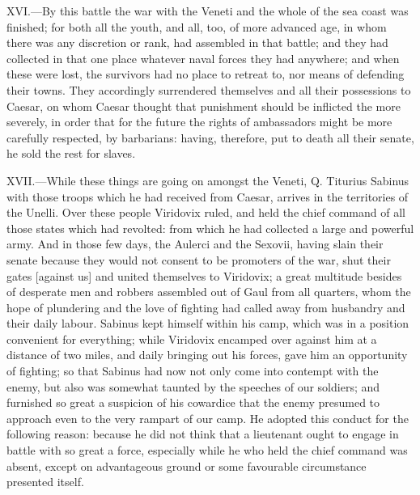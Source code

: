 XVI.—By this battle the war with the Veneti and the whole of the sea
coast was finished; for both all the youth, and all, too, of more
advanced age, in whom there was any discretion or rank, had assembled in
that battle; and they had collected in that one place whatever naval
forces they had anywhere; and when these were lost, the survivors had no
place to retreat to, nor means of defending their towns. They
accordingly surrendered themselves and all their possessions to Caesar,
on whom Caesar thought that punishment should be inflicted the more
severely, in order that for the future the rights of ambassadors might
be more carefully respected, by barbarians: having, therefore, put to
death all their senate, he sold the rest for slaves.

XVII.—While these things are going on amongst the Veneti, Q. Titurius
Sabinus with those troops which he had received from Caesar, arrives in
the territories of the Unelli. Over these people Viridovix ruled, and
held the chief command of all those states which had revolted: from
which he had collected a large and powerful army. And in those few days,
the Aulerci and the Sexovii, having slain their senate because they
would not consent to be promoters of the war, shut their gates [against
us] and united themselves to Viridovix; a great multitude besides of
desperate men and robbers assembled out of Gaul from all quarters, whom
the hope of plundering and the love of fighting had called away from
husbandry and their daily labour. Sabinus kept himself within his camp,
which was in a position convenient for everything; while Viridovix
encamped over against him at a distance of two miles, and daily bringing
out his forces, gave him an opportunity of fighting; so that Sabinus had
now not only come into contempt with the enemy, but also was somewhat
taunted by the speeches of our soldiers; and furnished so great a
suspicion of his cowardice that the enemy presumed to approach even to
the very rampart of our camp. He adopted this conduct for the following
reason: because he did not think that a lieutenant ought to engage in
battle with so great a force, especially while he who held the chief
command was absent, except on advantageous ground or some favourable
circumstance presented itself.

